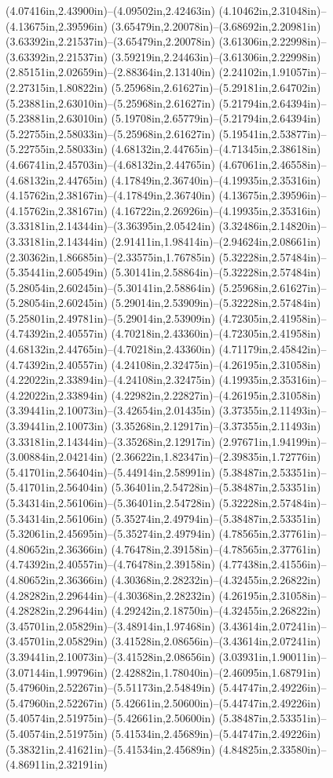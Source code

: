 (4.07416in,2.43900in)--(4.09502in,2.42463in) (4.10462in,2.31048in)--(4.13675in,2.39596in) (3.65479in,2.20078in)--(3.68692in,2.20981in) (3.63392in,2.21537in)--(3.65479in,2.20078in) (3.61306in,2.22998in)--(3.63392in,2.21537in) (3.59219in,2.24463in)--(3.61306in,2.22998in) (2.85151in,2.02659in)--(2.88364in,2.13140in) (2.24102in,1.91057in)--(2.27315in,1.80822in) (5.25968in,2.61627in)--(5.29181in,2.64702in) (5.23881in,2.63010in)--(5.25968in,2.61627in) (5.21794in,2.64394in)--(5.23881in,2.63010in) (5.19708in,2.65779in)--(5.21794in,2.64394in) (5.22755in,2.58033in)--(5.25968in,2.61627in) (5.19541in,2.53877in)--(5.22755in,2.58033in) (4.68132in,2.44765in)--(4.71345in,2.38618in) (4.66741in,2.45703in)--(4.68132in,2.44765in) (4.67061in,2.46558in)--(4.68132in,2.44765in) (4.17849in,2.36740in)--(4.19935in,2.35316in) (4.15762in,2.38167in)--(4.17849in,2.36740in) (4.13675in,2.39596in)--(4.15762in,2.38167in) (4.16722in,2.26926in)--(4.19935in,2.35316in) (3.33181in,2.14344in)--(3.36395in,2.05424in) (3.32486in,2.14820in)--(3.33181in,2.14344in) (2.91411in,1.98414in)--(2.94624in,2.08661in) (2.30362in,1.86685in)--(2.33575in,1.76785in) (5.32228in,2.57484in)--(5.35441in,2.60549in) (5.30141in,2.58864in)--(5.32228in,2.57484in) (5.28054in,2.60245in)--(5.30141in,2.58864in) (5.25968in,2.61627in)--(5.28054in,2.60245in) (5.29014in,2.53909in)--(5.32228in,2.57484in) (5.25801in,2.49781in)--(5.29014in,2.53909in) (4.72305in,2.41958in)--(4.74392in,2.40557in) (4.70218in,2.43360in)--(4.72305in,2.41958in) (4.68132in,2.44765in)--(4.70218in,2.43360in) (4.71179in,2.45842in)--(4.74392in,2.40557in) (4.24108in,2.32475in)--(4.26195in,2.31058in) (4.22022in,2.33894in)--(4.24108in,2.32475in) (4.19935in,2.35316in)--(4.22022in,2.33894in) (4.22982in,2.22827in)--(4.26195in,2.31058in) (3.39441in,2.10073in)--(3.42654in,2.01435in) (3.37355in,2.11493in)--(3.39441in,2.10073in) (3.35268in,2.12917in)--(3.37355in,2.11493in) (3.33181in,2.14344in)--(3.35268in,2.12917in) (2.97671in,1.94199in)--(3.00884in,2.04214in) (2.36622in,1.82347in)--(2.39835in,1.72776in) (5.41701in,2.56404in)--(5.44914in,2.58991in) (5.38487in,2.53351in)--(5.41701in,2.56404in) (5.36401in,2.54728in)--(5.38487in,2.53351in) (5.34314in,2.56106in)--(5.36401in,2.54728in) (5.32228in,2.57484in)--(5.34314in,2.56106in) (5.35274in,2.49794in)--(5.38487in,2.53351in) (5.32061in,2.45695in)--(5.35274in,2.49794in) (4.78565in,2.37761in)--(4.80652in,2.36366in) (4.76478in,2.39158in)--(4.78565in,2.37761in) (4.74392in,2.40557in)--(4.76478in,2.39158in) (4.77438in,2.41556in)--(4.80652in,2.36366in) (4.30368in,2.28232in)--(4.32455in,2.26822in) (4.28282in,2.29644in)--(4.30368in,2.28232in) (4.26195in,2.31058in)--(4.28282in,2.29644in) (4.29242in,2.18750in)--(4.32455in,2.26822in) (3.45701in,2.05829in)--(3.48914in,1.97468in) (3.43614in,2.07241in)--(3.45701in,2.05829in) (3.41528in,2.08656in)--(3.43614in,2.07241in) (3.39441in,2.10073in)--(3.41528in,2.08656in) (3.03931in,1.90011in)--(3.07144in,1.99796in) (2.42882in,1.78040in)--(2.46095in,1.68791in) (5.47960in,2.52267in)--(5.51173in,2.54849in) (5.44747in,2.49226in)--(5.47960in,2.52267in) (5.42661in,2.50600in)--(5.44747in,2.49226in) (5.40574in,2.51975in)--(5.42661in,2.50600in) (5.38487in,2.53351in)--(5.40574in,2.51975in) (5.41534in,2.45689in)--(5.44747in,2.49226in) (5.38321in,2.41621in)--(5.41534in,2.45689in) (4.84825in,2.33580in)--(4.86911in,2.32191in) 